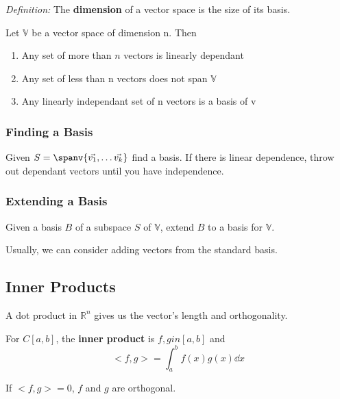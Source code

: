 \documentclass[12pt]{article}
\newcommand{\R}[1]{\mathbb{R}^{#1}}
\begin{document}

\textit{Definition:} The {\bf dimension} of a vector space is the size of its basis.

Let $\mathbb{V}$ be a vector space of dimension n. Then
\begin{enumerate}
\item Any set of more than $n$ vectors is linearly dependant
\item Any set of less than n vectors does not span $\mathbb{V}$
\item Any linearly independant set of n vectors is a basis of v
\end{enumerate}

\subsubsection*{Finding a Basis}
Given $S = \spanv{\vec{v_1},\dots \vec{v_k}}$ find a basis. If there is linear dependence, throw out dependant vectors until you have independence.


\subsubsection*{Extending a Basis}
Given a basis $B$ of a subspace $S$ of $\mathbb{V}$, extend $B$ to a basis for $\mathbb{V}$.


Usually, we can consider adding vectors from the standard basis.

\subsection*{Inner Products}
A dot product in $\R{n}$ gives us the vector's length and orthogonality.

For $C[a,b]$, the {\bf inner product} is $f, g in [a,b]$ and \[ <f,g> = \int_a^b f(x)g(x) \dd x \]

If $<f,g> = 0$, $f$ and $g$ are orthogonal.
\end{document}
